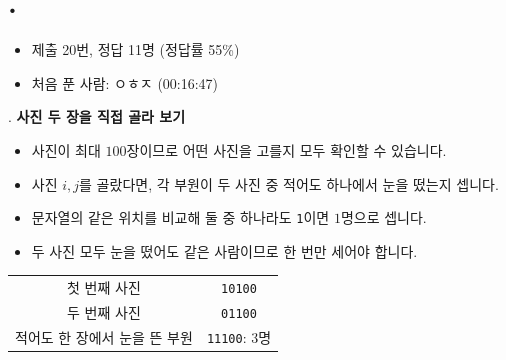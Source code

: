 
\section{\texorpdfstring{\pletter. \ptitle}{문제 \pletter}}

\begin{frame}[label=problem-G]
    \sectiontitle{\pletter}{\ptitle}
    \begin{itemize}
        \item 제출 20번, 정답 11명 (정답률 55\%)
        \item 처음 푼 사람: ㅇㅎㅈ (00:16:47)
    \end{itemize}
\end{frame}

\begin{frame}{\textbf{\pletter}. \ptitle}
    \textbf{사진 두 장을 직접 골라 보기}
\begin{itemize}
        \item 사진이 최대 $100$장이므로 어떤 사진을 고를지 모두 확인할 수 있습니다.
        \item 사진 $i,j$를 골랐다면, 각 부원이 두 사진 중 적어도 하나에서 눈을 떴는지 셉니다.
        \item 문자열의 같은 위치를 비교해 둘 중 하나라도 \texttt{1}이면 $1$명으로 셉니다.
        \item 두 사진 모두 눈을 떴어도 같은 사람이므로 한 번만 세어야 합니다.
    \end{itemize}
    \begin{center}
        \begin{tabular}{c|c}
            첫 번째 사진 & \texttt{10100}\\
            두 번째 사진 & \texttt{01100}\\\hline
            적어도 한 장에서 눈을 뜬 부원 & \texttt{11100}: $3$명
        \end{tabular}
    \end{center}
\end{frame}

